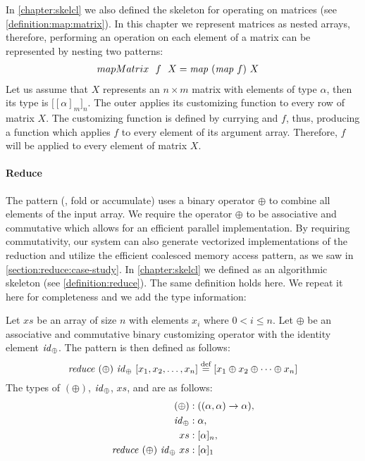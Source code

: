 \noindent
In \autoref{chapter:skelcl} we also defined the \map skeleton for operating on matrices (see \autoref{definition:map:matrix}).
In this chapter we represent matrices as nested arrays, therefore, performing an operation on each element of a matrix can be represented by nesting two \map patterns:
\begin{align*}
  mapMatrix\ \ f\ \ X &= \text{\textit{map}}\ (\text{\textit{map}}\ f)\ X
\end{align*}
Let us assume that $X$ represents an $n\times m$ matrix with elements of type $\alpha$, then its type is $\big[[\alpha]_m\big]_n$.
The outer \map applies its customizing function to every row of matrix $X$.
The customizing function is defined by currying \map and $f$, thus, producing a function which applies $f$ to every element of its argument array.
Therefore, $f$ will be applied to every element of matrix $X$.

\paragraph{Reduce}
The \reduce pattern (\aka, fold or accumulate) uses a binary operator $\oplus$ to combine all elements of the input array.
We require the operator $\oplus$ to be associative and commutative which allows for an efficient parallel implementation.
By requiring commutativity, our system can also generate vectorized implementations of the reduction and utilize the efficient coalesced memory access pattern, as we saw in \autoref{section:reduce:case-study}.
In \autoref{chapter:skelcl} we defined \reduce as an algorithmic skeleton (see \autoref{definition:reduce}).
The same definition holds here.
We repeat it here for completeness and we add the type information:
\begin{definition}
  \label{definition:pattern:reduce}
  Let $xs$ be an array of size $n$ with elements $x_i$ where $0 < i \leq n$.
  Let $\oplus$ be an associative and commutative binary customizing operator with the identity element $\text{\textit{id}}_\oplus$.
  The \reduce pattern is then defined as follows:
  \begin{equation*}
    \text{\textit{reduce}}\ (\oplus)\ \text{\textit{id}}_\oplus\ [x_1, x_2, \dots, x_n]
      \stackrel{\textrm{\scriptsize def}}{=} [x_1 \oplus x_2 \oplus \dots \oplus x_n]
  \end{equation*}
  The types of $(\oplus)$, $\text{\textit{id}}_\oplus$, $xs$, and \reduce are as follows:
  \begin{align*}
    (\oplus) &: ((\alpha, \alpha) \rightarrow \alpha),\\
    \text{\textit{id}}_\oplus &: \alpha,\\
    xs &: [\alpha]_n,\\
    \text{\textit{reduce}}\ (\oplus)\ \text{\textit{id}}_\oplus\ xs &: [\alpha]_1
  \end{align*}
\end{definition}


